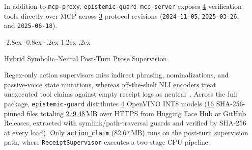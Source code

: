\documentclass[10pt,twocolumn]{article}
\makeatletter
\renewcommand\subsection{\@startsection{subsection}{2}{\z@}%
  {-2.8ex \@plus -0.8ex \@minus -.2ex}%
  {1.2ex \@plus .2ex}%
  {\normalfont\large\bfseries\raggedright}}
\makeatother
\begin{document}
In addition to \texttt{mcp-proxy}, \texttt{epistemic-guard mcp-server} exposes \href{https://github.com/AlienatedAliens/epistemic-guard/blob/v0.5.2/results/table1_architecture.json\#L17}{4} verification tools directly over MCP across \href{https://github.com/AlienatedAliens/epistemic-guard/blob/v0.5.2/results/table1_architecture.json\#L31}{3} protocol revisions (\texttt{2024-11-05}, \texttt{2025-03-26}, and \texttt{2025-06-18}).

\subsection{Hybrid Symbolic--Neural Post-Turn Prose Supervision}
\label{sec:supervision}

Regex-only action supervisors miss indirect phrasing, nominalizations, and passive-voice state mutations, whereas off-the-shelf NLI encoders treat unexecuted tool claims against empty receipt logs as neutral~\cite{maxwell2026evasion}. Across the full package, \texttt{epistemic-guard} distributes \href{https://github.com/AlienatedAliens/epistemic-guard/blob/v0.5.2/results/table1_architecture.json\#L16}{4} OpenVINO INT8 models (\href{https://github.com/AlienatedAliens/epistemic-guard/blob/v0.5.2/results/table1_architecture.json\#L25}{16} SHA-256-pinned files totaling \href{https://github.com/AlienatedAliens/epistemic-guard/blob/v0.5.2/results/table1_architecture.json\#L34}{279.48}\,MB over HTTPS from Hugging Face Hub or GitHub Releases, extracted with symlink/path-traversal guards and verified by SHA-256 at every load). Only \texttt{action\_claim} (\href{https://github.com/AlienatedAliens/epistemic-guard/blob/v0.5.2/results/table1_architecture.json\#L19}{82.67}\,MB) runs on the post-turn supervision path, where \texttt{ReceiptSupervisor} executes a two-stage CPU pipeline:
\end{document}

